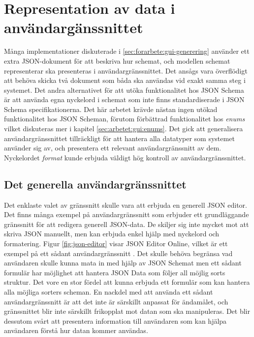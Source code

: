 \section{Representation av data i användargänssnittet}
\label{sec:arbetet:gui}

Många implementationer diskuterade i \ref{sec:forarbete:gui-generering} använder ett extra JSON-dokument för att beskriva hur schemat, och modellen schemat representerar ska presenteras i användargränssnittet. Det ansågs vara överflödigt att behöva skicka två dokument som båda ska användas vid exakt samma steg i systemet. Det andra alternativet för att utöka funktionalitet hos JSON Schema är att använda egna nyckelord i schemat som inte finns standardiserade i JSON Schema specifikationerna. Det här arbetet krävde nästan ingen utökad funktionalitet hos JSON Scheman, förutom förbättrad funktionalitet hos \textit{enums} vilket diskuteras mer i kapitel \ref{sec:arbetet:gui:enums}. Det gick att generalisera användargränssnittet tillräckligt för att hantera alla datatyper som systemet använder sig av, och presentera ett relevant användargränssnitt av dem. Nyckelordet \textit{format} kunde erbjuda väldigt hög kontroll av användargränssnittet.

\subsection{Det generella användargränssnittet}

Det enklaste valet av gränssnitt skulle vara att erbjuda en generell JSON editor. Det finns många exempel på användargränssnitt som erbjuder ett grundläggande gränssnitt för att redigera generell JSON-data. De skiljer sig inte mycket mot att skriva JSON manuellt, men kan erbjuda enkel hjälp med nyckelord och formatering. Figur \ref{fig:json-editor} visar JSON Editor Online, vilket är ett exempel på ett sådant användargränssnitt \cite{DeJong2018}. Det skulle behöva begränsa vad användaren skulle kunna mata in med hjälp av JSON Schemat men ett sådant formulär har möjlighet att hantera JSON Data som följer all möjlig sorts struktur. Det vore en stor fördel att kunna erbjuda ett formulär som kan hantera alla möjliga sorters scheman. En nackdel med att använda ett sådant användargränssnitt är att det inte är särskillt anpassat för ändamålet, och gränssnittet blir inte särskillt frikopplat mot datan som ska manipuleras. Det blir dessutom svårt att presentera information till användaren som kan hjälpa användaren förstå hur datan kommer användas.

